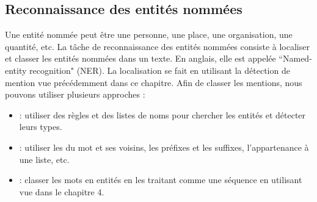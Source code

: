 \documentclass{KodeBook}
\begin{document}
\subsection{Reconnaissance des entités nommées}

Une entité nommée peut être une personne, une place, une organisation, une quantité, etc.
La tâche de reconnaissance des entités nommées consiste à localiser et classer les entités nommées dans un texte. 
En anglais, elle est appelée ``Named-entity recognition" (NER). 
La localisation se fait en utilisant la détection de mention vue précédemment dans ce chapitre.
Afin de classer les mentions, nous pouvons utiliser plusieurs approches :
\begin{itemize}
	\item {} : utiliser des règles et des listes de noms pour chercher les entités et détecter leurs types.
	\item {} : utiliser les  du mot et ses voisins, les préfixes et les suffixes, l'appartenance à une liste, etc.
	\item {} : classer les mots en entités en les traitant comme une séquence en utilisant  vue dans le chapitre 4.
	
\end{itemize}
\end{document}
